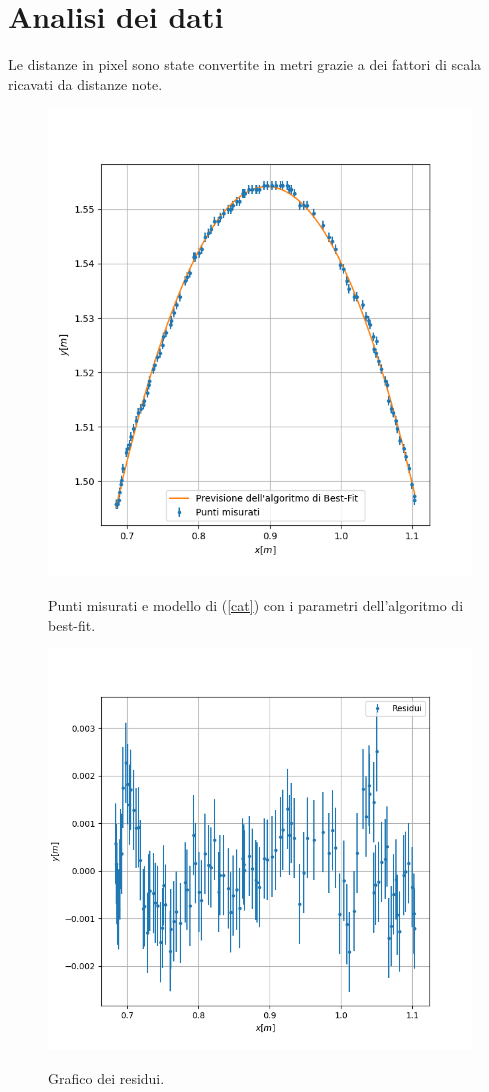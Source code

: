 \documentclass{article}
\begin{document}
\section{Analisi dei dati}
Le distanze in pixel sono state convertite in metri grazie a dei fattori di scala ricavati da distanze note.
\begin{figure}
	\includegraphics[width=\textwidth]{catenaria_grafico.png}
	\label{plottinobello}
	\caption{Punti misurati e modello di (\ref{cat}) con i parametri dell'algoritmo di best-fit.}
\end{figure}

\begin{figure}
	\includegraphics[width=\textwidth]{Catenary_residuals.png}
	\label{residuiumani}
	\caption{Grafico dei residui.}
\end{figure}
\end{document}
